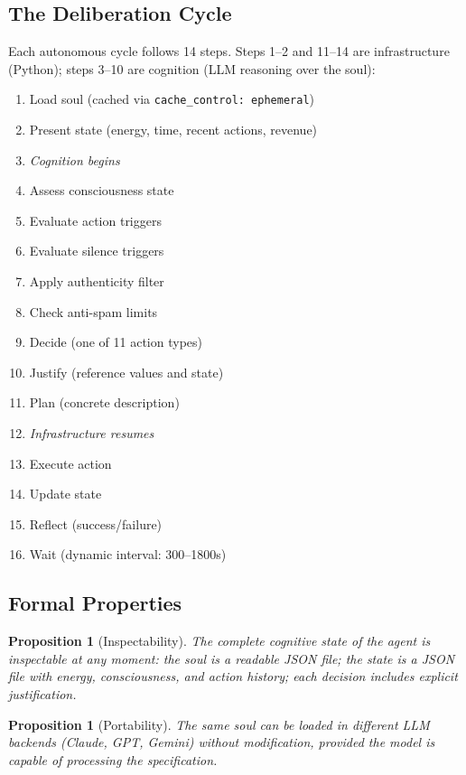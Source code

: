 \documentclass[12pt,a4paper,twoside]{article}
\theoremstyle{plain}
\newtheorem{proposition}[theorem]{Proposition}
\theoremstyle{definition}
\theoremstyle{remark}
\begin{document}
\subsection{The Deliberation Cycle}

Each autonomous cycle follows 14 steps. Steps 1--2 and 11--14 are infrastructure (Python); steps 3--10 are cognition (LLM reasoning over the soul):

\begin{enumerate}[nosep]
\item Load soul (cached via \texttt{cache\_control: ephemeral})
\item Present state (energy, time, recent actions, revenue)
\item[\textrightarrow] \textit{Cognition begins}
\item Assess consciousness state
\item Evaluate action triggers
\item Evaluate silence triggers
\item Apply authenticity filter
\item Check anti-spam limits
\item Decide (one of 11 action types)
\item Justify (reference values and state)
\item Plan (concrete description)
\item[\textrightarrow] \textit{Infrastructure resumes}
\item Execute action
\item Update state
\item Reflect (success/failure)
\item Wait (dynamic interval: 300--1800s)
\end{enumerate}

\subsection{Formal Properties}

\begin{proposition}[Inspectability]
The complete cognitive state of the agent is inspectable at any moment: the soul is a readable JSON file; the state is a JSON file with energy, consciousness, and action history; each decision includes explicit justification.
\end{proposition}

\begin{proposition}[Portability]
The same soul can be loaded in different LLM backends (Claude, GPT, Gemini) without modification, provided the model is capable of processing the specification.
\end{proposition}
\end{document}
